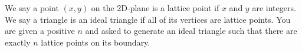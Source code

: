 We say a point $(x,y)$ on the 2D-plane is a lattice point if $x$ and $y$ are integers.
We say a triangle is an ideal triangle if all of its vertices are lattice points.
You are given a positive $n$ and asked to generate an ideal triangle such that 
there are exactly $n$ lattice points on its boundary.
